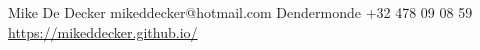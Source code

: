 \documentclass[grey]{hipstercv}
\newlength{\rightcolwidth}
\begin{document}
\begin{paracol}{2}
\vfill{} %

\setlength{\parindent}{0pt}
\begin{minipage}[t]{\rightcolwidth}
\begin{center}\fontfamily{\sfdefault}\selectfont \color{black!70}
{\small Mike De Decker  mikeddecker@hotmail.com  Dendermonde  +32 478 09 08 59 \newline{} \protect\url{https://mikeddecker.github.io/}
}
\end{center}
\end{minipage}


\end{paracol}
\end{document}
